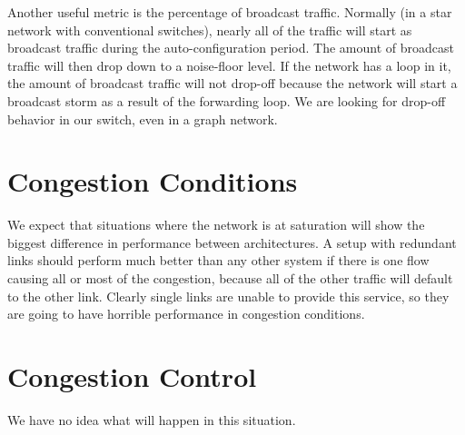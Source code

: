 \documentclass{article}
\begin{document}
Another useful metric is the percentage of broadcast traffic.
Normally (in a star network with conventional switches), nearly all of the traffic will start as broadcast traffic during the auto-configuration period.
The amount of broadcast traffic will then drop down to a noise-floor level.
If the network has a loop in it, the amount of broadcast traffic will not drop-off because the network will start a broadcast storm as a result of the forwarding loop.
We are looking for drop-off behavior in our switch, even in a graph network.


\section{Congestion Conditions}
We expect that situations where the network is at saturation will show the biggest difference in performance between architectures.
A setup with redundant links should perform much better than any other system if there is one flow causing all or most of the congestion, because all of the other traffic will default to the other link.
Clearly single links are unable to provide this service, so they are going to have horrible performance in congestion conditions.
\section{Congestion Control}
We have no idea what will happen in this situation.
\end{document}
